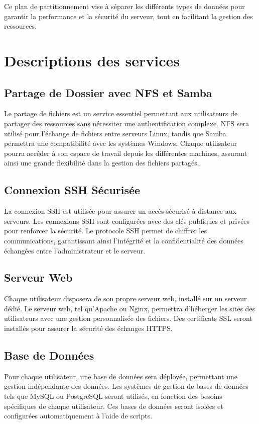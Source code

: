\documentclass[a4paper, 12pt]{article}
\begin{document}
	Ce plan de partitionnement vise à séparer les différents types de données pour garantir la performance et la sécurité du serveur, tout en facilitant la gestion des ressources.
	
	\section{Descriptions des services}
	
	\subsection{Partage de Dossier avec NFS et Samba}
	Le partage de fichiers est un service essentiel permettant aux utilisateurs de partager des ressources sans nécessiter une authentification complexe. NFS sera utilisé pour l'échange de fichiers entre serveurs Linux, tandis que Samba permettra une compatibilité avec les systèmes Windows. Chaque utilisateur pourra accéder à son espace de travail depuis les différentes machines, assurant ainsi une grande flexibilité dans la gestion des fichiers partagés.
	
	\subsection{Connexion SSH Sécurisée}
	La connexion SSH est utilisée pour assurer un accès sécurisé à distance aux serveurs. Les connexions SSH sont configurées avec des clés publiques et privées pour renforcer la sécurité. Le protocole SSH permet de chiffrer les communications, garantissant ainsi l'intégrité et la confidentialité des données échangées entre l'administrateur et le serveur.
	
	\subsection{Serveur Web}
	Chaque utilisateur disposera de son propre serveur web, installé sur un serveur dédié. Le serveur web, tel qu'Apache ou Nginx, permettra d'héberger les sites des utilisateurs avec une gestion personnalisée des fichiers. Des certificats SSL seront installés pour assurer la sécurité des échanges HTTPS.
	
	\subsection{Base de Données}
	Pour chaque utilisateur, une base de données sera déployée, permettant une gestion indépendante des données. Les systèmes de gestion de bases de données tels que MySQL ou PostgreSQL seront utilisés, en fonction des besoins spécifiques de chaque utilisateur. Ces bases de données seront isolées et configurées automatiquement à l'aide de scripts.
	
\end{document}
